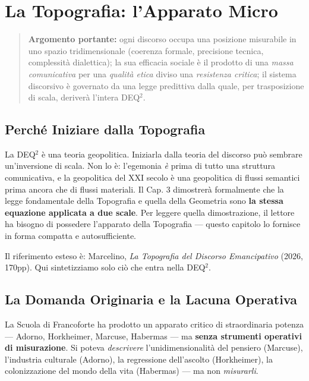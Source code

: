 \chapter{La Topografia: l'Apparato
Micro}\label{la-topografia-lapparato-micro}

\begin{quote}
\textbf{Argomento portante:} ogni discorso occupa una posizione
misurabile in uno spazio tridimensionale (coerenza formale, precisione
tecnica, complessità dialettica); la sua efficacia sociale è il prodotto
di una \emph{massa comunicativa} per una \emph{qualità etica} diviso una
\emph{resistenza critica}; il sistema discorsivo è governato da una
legge predittiva dalla quale, per trasposizione di scala, deriverà
l'intera DEQ$^2$.
\end{quote}



\section{Perché Iniziare dalla
Topografia}\label{perchuxe9-iniziare-dalla-topografia}

La DEQ$^2$ è una teoria geopolitica. Iniziarla dalla teoria del discorso
può sembrare un'inversione di scala. Non lo è: l'egemonia \emph{è} prima
di tutto una struttura comunicativa, e la geopolitica del XXI secolo è
una geopolitica di flussi semantici prima ancora che di flussi
materiali. Il Cap. 3 dimostrerà formalmente che la legge fondamentale
della Topografia e quella della Geometria sono \textbf{la stessa
equazione applicata a due scale}. Per leggere quella dimostrazione, il
lettore ha bisogno di possedere l'apparato della Topografia --- questo
capitolo lo fornisce in forma compatta e autosufficiente.

Il riferimento esteso è: Marcelino, \emph{La Topografia del Discorso
Emancipativo} (2026, 170pp). Qui sintetizziamo solo ciò che entra nella
DEQ$^2$.



\section{La Domanda Originaria e la Lacuna
Operativa}\label{la-domanda-originaria-e-la-lacuna-operativa}

La Scuola di Francoforte ha prodotto un apparato critico di
straordinaria potenza --- Adorno, Horkheimer, Marcuse, Habermas --- ma
\textbf{senza strumenti operativi di misurazione}. Si poteva
\emph{descrivere} l'unidimensionalità del pensiero (Marcuse),
l'industria culturale (Adorno), la regressione dell'ascolto
(Horkheimer), la colonizzazione del mondo della vita (Habermas) --- ma
non \emph{misurarli}.

